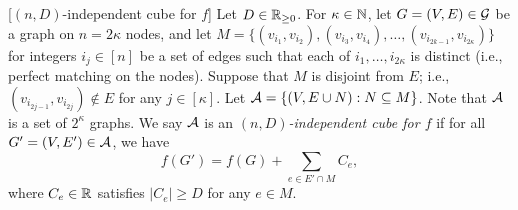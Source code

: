 \begin{definition}\label{chap1-def:mono-cube}[$(n,D)$-independent cube for $f$]
  Let 
  $D \in \mathbb{R}_{\ge0}$. 
  For 
  $\kappa \in \mathbb{N}$, 
  let $G=(V,E) \in \mathcal{G}$ be a graph on 
  $n = 2\kappa$ 
  nodes, and let 
  $M = \{(v_{i_1}, v_{i_2}),(v_{i_3},v_{i_4}),\ldots,(v_{i_{2k-1}},v_{i_{2\kappa}})\}$ 
  for integers $i_j \in [n]$ 
  be 
  a set of edges such that each of $i_1, \ldots, i_{2\kappa}$ is distinct (i.e., perfect matching on the nodes).
  Suppose that 
  $M$ is disjoint from 
  $E$; 
  i.e., 
  $(v_{i_{2j-1}}, v_{i_{2j}}) \notin E$ 
  for any 
  $j\in[\kappa]$. 
  Let 
  $\mathcal{A} = \{(V, E \cup N): N \subseteq M\}$.
  Note that 
  $\mathcal{A}$ is a set of 
  $2^\kappa$ 
  graphs.
  We say $\mathcal{A}$ 
  is 
  an \emph{$(n,D)$-independent cube for $f$} if for all
  $G'=(V,E') \in \mathcal{A}$, 
  we have
  \[
    f(G') = f(G) + \sum_{e \in E' \cap M} C_e,
  \]
  where $C_e \in \mathbb{R}$ satisfies $|C_e| \geq D$ for any $e \in M$.
\end{definition}


